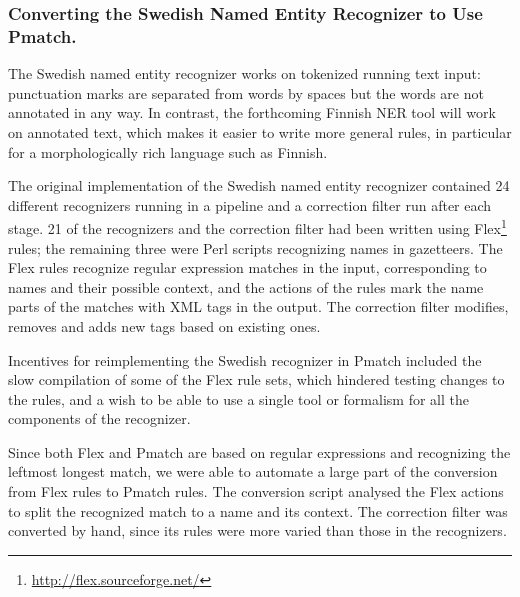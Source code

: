\documentclass{llncs}
\begin{document}
\subsubsection{Converting the Swedish Named Entity Recognizer to Use
  Pmatch.}

The Swedish named entity recognizer works on tokenized running text
input: punctuation marks are separated from words by spaces but the
words are not annotated in any way. In contrast, the forthcoming
Finnish NER tool will work on annotated text, which makes it easier to
write more general rules, in particular for a morphologically rich
language such as Finnish.

The original implementation of the Swedish named entity recognizer
\cite{kokkinakis/2003} contained 24 different recognizers running in a
pipeline and a correction filter run after each stage. 21 of the
recognizers and the correction filter had been written using
Flex\footnote{\url{http://flex.sourceforge.net/}} rules; the remaining three
were Perl scripts recognizing names in gazetteers. The Flex rules
recognize regular expression matches in the input, corresponding to names
and their possible context, and the actions of the rules mark the name
parts of the matches with XML tags in the output. The correction
filter modifies, removes and adds new tags based on existing ones.


Incentives for reimplementing the Swedish recognizer in Pmatch
included the slow compilation of some of the Flex rule sets, which
hindered testing changes to the rules, and a
wish to be able to use a single tool or
formalism for all the components of the recognizer.

Since both Flex and Pmatch are based on regular expressions and
recognizing the leftmost longest match, we were able to automate a
large part of the conversion from Flex rules to Pmatch rules. The
conversion script analysed the Flex actions to split the recognized
match to a name and its context. The correction filter was converted
by hand, since its rules were more varied than those in the
recognizers.
\end{document}

